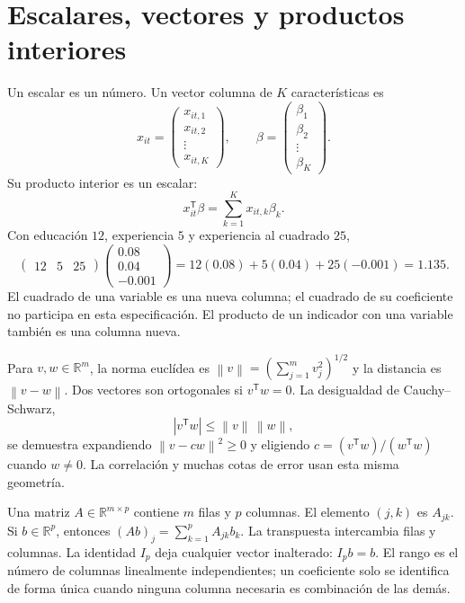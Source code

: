 \documentclass[11pt,a4paper]{article}
\newcommand{\R}{\mathbb R}
\newcommand{\T}{^{\mathsf T}}
\newcommand{\norm}[1]{\left\lVert #1\right\rVert}
\theoremstyle{definition}
\begin{document}
\section{Escalares, vectores y productos interiores}
Un escalar es un número. Un vector columna de $K$ características es
\[
x_{it}=\begin{pmatrix}x_{it,1}\\x_{it,2}\\\vdots\\x_{it,K}\end{pmatrix},
\qquad
\beta=\begin{pmatrix}\beta_1\\\beta_2\\\vdots\\\beta_K\end{pmatrix}.
\]
Su producto interior es un escalar:
\[
x_{it}\T\beta=\sum_{k=1}^K x_{it,k}\beta_k.
\]
Con educación $12$, experiencia $5$ y experiencia al cuadrado $25$,
\[
\begin{pmatrix}12&5&25\end{pmatrix}
\begin{pmatrix}0.08\\0.04\\-0.001\end{pmatrix}
=12(0.08)+5(0.04)+25(-0.001)=1.135.
\]
El cuadrado de una variable es una nueva columna; el cuadrado de su coeficiente no participa en esta especificación. El producto de un indicador con una variable también es una columna nueva.

Para $v,w\in\R^m$, la norma euclídea es $\norm v=(\sum_{j=1}^m v_j^2)^{1/2}$ y la distancia es $\norm{v-w}$. Dos vectores son ortogonales si $v\T w=0$. La desigualdad de Cauchy--Schwarz,
\[
|v\T w|\le\norm v\,\norm w,
\]
se demuestra expandiendo $\norm{v-cw}^2\ge0$ y eligiendo $c=(v\T w)/(w\T w)$ cuando $w\ne0$. La correlación y muchas cotas de error usan esta misma geometría.

Una matriz $A\in\R^{m\times p}$ contiene $m$ filas y $p$ columnas. El elemento $(j,k)$ es $A_{jk}$. Si $b\in\R^p$, entonces $(Ab)_j=\sum_{k=1}^p A_{jk}b_k$. La transpuesta intercambia filas y columnas. La identidad $I_p$ deja cualquier vector inalterado: $I_pb=b$. El rango es el número de columnas linealmente independientes; un coeficiente solo se identifica de forma única cuando ninguna columna necesaria es combinación de las demás.
\end{document}
